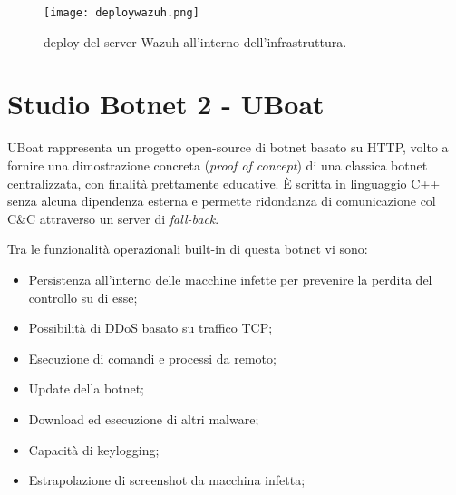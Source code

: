 \begin{figure}[hbtp]
    \centering
    \texttt{[image: deploywazuh.png]}
    \caption{deploy del server Wazuh all'interno dell'infrastruttura.}
    \label{fig:deploywazuh}
\end{figure}



\chapter{Studio Botnet 2 - UBoat}
\label{uboat}




UBoat \cite{uboat} rappresenta un progetto open-source di botnet basato su HTTP, volto a fornire una dimostrazione concreta (\textit{proof of concept}) di una classica botnet centralizzata, con finalità prettamente educative. È scritta in linguaggio C++ senza alcuna dipendenza esterna e permette ridondanza di comunicazione col C\&C attraverso un server di \textit{fall-back}.

Tra le funzionalità operazionali built-in  di questa botnet vi sono:
\begin{itemize}
    \item Persistenza all'interno delle macchine infette per prevenire la perdita del controllo su di esse;
    \item Possibilità di DDoS basato su traffico TCP;
    \item Esecuzione di comandi e  processi da remoto;
    \item Update della botnet;
    \item Download ed esecuzione di altri malware;
    \item Capacità di keylogging;
    \item Estrapolazione di screenshot da macchina infetta;
\end{itemize}

